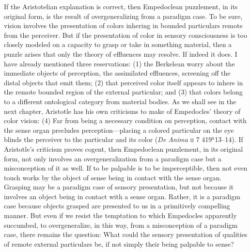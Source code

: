 If the Aristotelian explanation is correct, then Empedoclean puzzlement, in its original form, is the result of overgeneralizing from a paradigm case. To be sure, vision involves the presentation of colors inhering in bounded particulars remote from the perceiver. But if the presentation of color in sensory consciousness is too closely modeled on a capacity to grasp or take in something material, then a puzzle arises that only the theory of effluences may resolve. If indeed it does. I have already mentioned three reservations: (1) the Berkelean worry about the immediate objects of perception, the assimilated effluences, screening off the distal objects that emit them; (2) that perceived color itself appears to inhere in the remote bounded region of the external particular; and (3) that colors belong to a different ontological category from material bodies. As we shall see in the next chapter, Aristotle has his own criticisms to make of Empedocles' theory of color vision: (4) Far from being a necessary condition on perception, contact with the sense organ precludes perception---placing a colored particular on the eye blinds the perceiver to the particular and its color (\emph{De Anima} \textsc{ii} 7 419\( ^{a} \)13--14). If Aristotle's criticism proves cogent, then Empedoclean puzzlement, in its original form, not only involves an overgeneralization from a paradigm case but a misconception of it as well. If to be palpable is to be imperceptible, then not even touch works by the object of sense being in contact with the sense organ. Grasping may be a paradigm case of sensory presentation, but not because it involves an object being in contact with a sense organ. Rather, it is a paradigm case because objects grasped are presented to us in a primitively compelling manner. But even if we resist the temptation to which Empedocles apparently succumbed, to overgeneralize, in this way, from a misconception of a paradigm case, there remains the question: What could the sensory presentation of qualities of remote external particulars be, if not simply their being palpable to sense?


